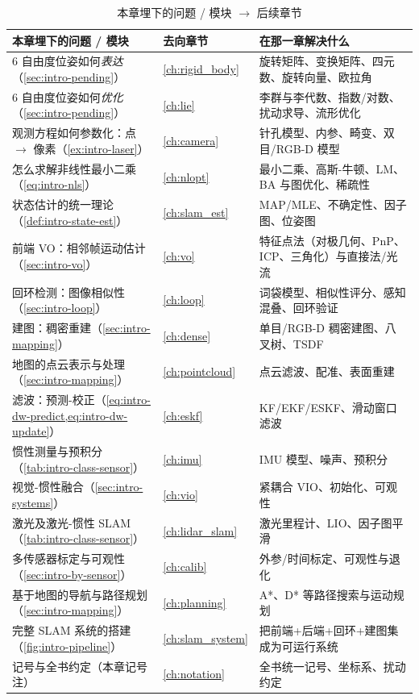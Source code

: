 \begin{table}[H]\centering\small
\caption{本章埋下的问题 / 模块 $\to$ 后续章节}
\label{tab:intro-roadmap}
\begin{tabular}{p{} p{} p{}}
\toprule
本章埋下的问题 / 模块 & 去向章节 & 在那一章解决什么 \\
\midrule
6 自由度位姿如何\emph{表达}（\cref{sec:intro-pending}） & \cref{ch:rigid_body} & 旋转矩阵、变换矩阵、四元数、旋转向量、欧拉角 \\
6 自由度位姿如何\emph{优化}（\cref{sec:intro-pending}） & \cref{ch:lie} & 李群与李代数、指数/对数、扰动求导、流形优化 \\
观测方程如何参数化：点 $\to$ 像素（\cref{ex:intro-laser}） & \cref{ch:camera} & 针孔模型、内参、畸变、双目/RGB-D 模型 \\
怎么求解非线性最小二乘（\cref{eq:intro-nls}） & \cref{ch:nlopt} & 最小二乘、高斯-牛顿、LM、BA 与图优化、稀疏性 \\
状态估计的统一理论（\cref{def:intro-state-est}） & \cref{ch:slam_est} & MAP/MLE、不确定性、因子图、位姿图 \\
前端 VO：相邻帧运动估计（\cref{sec:intro-vo}） & \cref{ch:vo} & 特征点法（对极几何、PnP、ICP、三角化）与直接法/光流 \\
回环检测：图像相似性（\cref{sec:intro-loop}） & \cref{ch:loop} & 词袋模型、相似性评分、感知混叠、回环验证 \\
建图：稠密重建（\cref{sec:intro-mapping}） & \cref{ch:dense} & 单目/RGB-D 稠密建图、八叉树、TSDF \\
地图的点云表示与处理（\cref{sec:intro-mapping}） & \cref{ch:pointcloud} & 点云滤波、配准、表面重建 \\
滤波：预测-校正（\cref{eq:intro-dw-predict,eq:intro-dw-update}） & \cref{ch:eskf} & KF/EKF/ESKF、滑动窗口滤波 \\
惯性测量与预积分（\cref{tab:intro-class-sensor}） & \cref{ch:imu} & IMU 模型、噪声、预积分 \\
视觉-惯性融合（\cref{sec:intro-systems}） & \cref{ch:vio} & 紧耦合 VIO、初始化、可观性 \\
激光及激光-惯性 SLAM（\cref{tab:intro-class-sensor}） & \cref{ch:lidar_slam} & 激光里程计、LIO、因子图平滑 \\
多传感器标定与可观性（\cref{sec:intro-by-sensor}） & \cref{ch:calib} & 外参/时间标定、可观性与退化 \\
基于地图的导航与路径规划（\cref{sec:intro-mapping}） & \cref{ch:planning} & A*、D* 等路径搜索与运动规划 \\
完整 SLAM 系统的搭建（\cref{fig:intro-pipeline}） & \cref{ch:slam_system} & 把前端+后端+回环+建图集成为可运行系统 \\
记号与全书约定（本章记号注） & \cref{ch:notation} & 全书统一记号、坐标系、扰动约定 \\
\bottomrule
\end{tabular}
\end{table}

